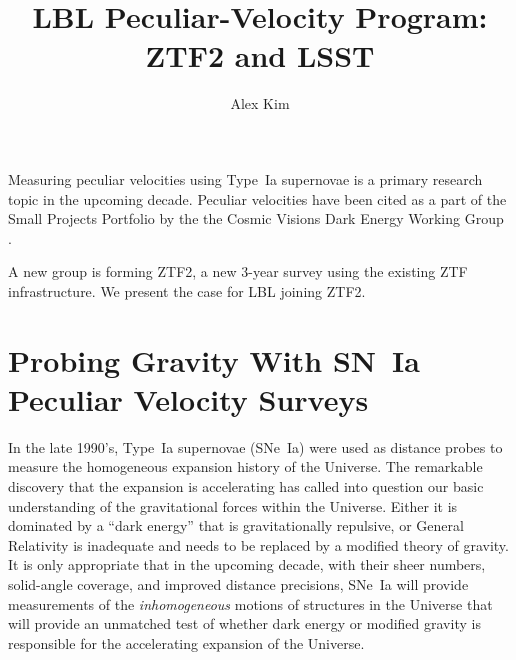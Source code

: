 \documentclass[11pt, oneside]{article}   	%
\title{LBL Peculiar-Velocity Program: ZTF2 and LSST}
\author{Alex Kim}
\begin{document}
\maketitle


Measuring peculiar velocities using Type~Ia supernovae is a primary research topic in the upcoming decade.  Peculiar velocities have
been cited as a part of the   Small Projects Portfolio  by the the Cosmic Visions Dark Energy Working Group \citep{2018arXiv180207216D}.

A new group is forming ZTF2, a new 3-year survey using the existing ZTF infrastructure.  We present the case for LBL joining ZTF2.

\section{Probing Gravity With SN~Ia  Peculiar Velocity Surveys}
In the late 1990's, Type~Ia supernovae (SNe~Ia) were used as distance probes to measure the homogeneous expansion history of the Universe.  The remarkable discovery
that the expansion is accelerating  has called into question our basic understanding of the gravitational forces within the Universe.  Either it
is dominated by a ``dark energy'' that is gravitationally repulsive, or General Relativity is inadequate and needs to be replaced by a modified theory of
gravity.  It is only appropriate that in the upcoming decade, with their sheer numbers, solid-angle coverage,
and improved distance precisions, SNe~Ia will provide measurements of the {\it inhomogeneous} motions of structures in the Universe
that will provide an unmatched test of whether dark energy or modified gravity is responsible for the accelerating expansion of the Universe.
\end{document}
